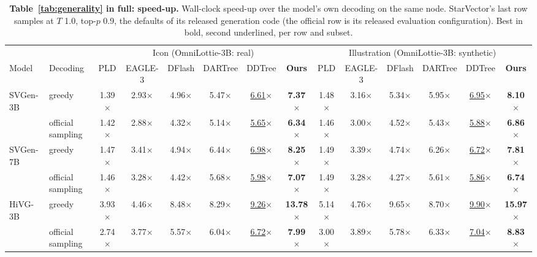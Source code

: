 \begin{table}[t]
\caption{\textbf{Table~\ref{tab:generality} in full: speed-up.} Wall-clock speed-up over the model's own decoding on the same node. StarVector's last row samples at $T$ 1.0, top-$p$ 0.9, the defaults of its released generation code (the official row is its released evaluation configuration). Best in bold, second underlined, per row and subset.}
\label{app:t3-speed}
\centering
\footnotesize
\setlength{\tabcolsep}{2.0pt}
\begin{tabular*}{\textwidth}{@{\extracolsep{\fill}}ll*{12}{c}@{}}
\toprule
 & & \multicolumn{6}{c}{Icon (OmniLottie-3B: real)} & \multicolumn{6}{c}{Illustration (OmniLottie-3B: synthetic)} \\
\cmidrule(lr){3-8}\cmidrule(lr){9-14}
Model & Decoding & PLD & EAGLE-3 & DFlash & DARTree & DDTree & \textbf{Ours} & PLD & EAGLE-3 & DFlash & DARTree & DDTree & \textbf{Ours} \\
\midrule
SVGen-3B & greedy & 1.39$\times$ & 2.93$\times$ & 4.96$\times$ & 5.47$\times$ & \underline{6.61}$\times$ & \textbf{7.37}$\times$ & 1.48$\times$ & 3.16$\times$ & 5.34$\times$ & 5.95$\times$ & \underline{6.95}$\times$ & \textbf{8.10}$\times$ \\
 & official sampling & 1.42$\times$ & 2.88$\times$ & 4.32$\times$ & 5.14$\times$ & \underline{5.65}$\times$ & \textbf{6.34}$\times$ & 1.46$\times$ & 3.00$\times$ & 4.52$\times$ & 5.43$\times$ & \underline{5.88}$\times$ & \textbf{6.86}$\times$ \\
\addlinespace[2pt]
SVGen-7B & greedy & 1.47$\times$ & 3.41$\times$ & 4.94$\times$ & 6.44$\times$ & \underline{6.98}$\times$ & \textbf{8.25}$\times$ & 1.49$\times$ & 3.39$\times$ & 4.74$\times$ & 6.26$\times$ & \underline{6.72}$\times$ & \textbf{7.81}$\times$ \\
 & official sampling & 1.46$\times$ & 3.28$\times$ & 4.42$\times$ & 5.68$\times$ & \underline{5.98}$\times$ & \textbf{7.07}$\times$ & 1.49$\times$ & 3.28$\times$ & 4.27$\times$ & 5.61$\times$ & \underline{5.86}$\times$ & \textbf{6.74}$\times$ \\
\addlinespace[2pt]
HiVG-3B & greedy & 3.93$\times$ & 4.46$\times$ & 8.48$\times$ & 8.29$\times$ & \underline{9.26}$\times$ & \textbf{13.78}$\times$ & 5.14$\times$ & 4.76$\times$ & 9.65$\times$ & 8.70$\times$ & \underline{9.90}$\times$ & \textbf{15.97}$\times$ \\
 & official sampling & 2.74$\times$ & 3.77$\times$ & 5.57$\times$ & 6.04$\times$ & \underline{6.72}$\times$ & \textbf{7.99}$\times$ & 3.00$\times$ & 3.89$\times$ & 5.78$\times$ & 6.33$\times$ & \underline{7.04}$\times$ & \textbf{8.83}$\times$ \\

\end{tabular*}
\end{table}

